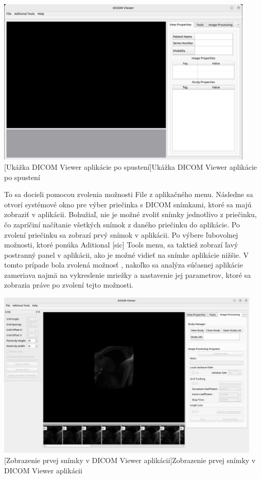 {\begin {center}
        \centering
        \includegraphics[height=8cm]{media/existing_app/init.png}
        [Ukážka DICOM Viewer aplikácie po spustení]{Ukážka DICOM Viewer aplikácie po spustení}
\end {center}

To sa docieli pomocou zvolenia možnosti File  z aplikačného menu. Následne sa otvorí systémové okno pre výber priečinka s DICOM snímkami, ktoré sa majú zobraziť v aplikácii. Bohužiaľ, nie je možné zvoliť snímky jednotlivo z priečinku, čo zapríčiní načítanie všetkých snímok z daného priečinku do aplikácie. Po zvolení priečinku sa zobrazí prvý snímok v aplikácii. Po výbere ľubovolnej možnosti, ktoré ponúka Aditional [sic] Tools menu, sa taktiež zobrazí ľavý postranný panel v aplikácii, ako je možné vidieť na snímke aplikácie nižšie. V tomto prípade bola zvolená možnosť , nakoľko sa analýza súčasnej aplikácie zameriava najmä na vykreslenie mriežky a nastavenie jej parametrov, ktoré sa zobrazia práve po zvolení tejto možnosti.

\begin {center}
        \centering
        \includegraphics[height=8cm]{media/existing_app/app_with_grids_panel.png}
        [Zobrazenie prvej snímky v DICOM Viewer aplikácii]{Zobrazenie prvej snímky v DICOM Viewer aplikácii}
\end {center}

}

